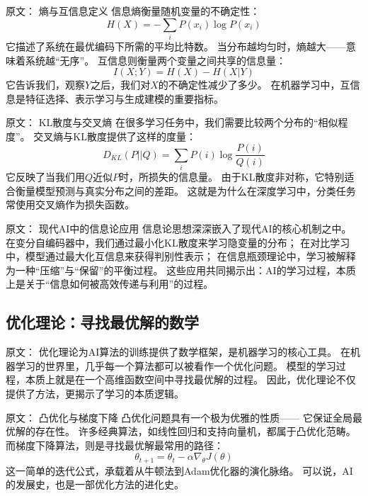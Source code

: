 原文：
熵与互信息定义
信息熵衡量随机变量的不确定性：
$$H(X) = -\sum_{i} P(x_i) \log P(x_i)$$
它描述了系统在最优编码下所需的平均比特数。  
当分布越均匀时，熵越大——意味着系统越“无序”。  
互信息则衡量两个变量之间共享的信息量：
$$I(X;Y) = H(X) - H(X|Y)$$
它告诉我们，观察$Y$之后，我们对$X$的不确定性减少了多少。  
在机器学习中，互信息是特征选择、表示学习与生成建模的重要指标。



原文：
KL散度与交叉熵
在很多学习任务中，我们需要比较两个分布的“相似程度”。  
交叉熵与KL散度提供了这样的度量：
$$D_{KL}(P||Q) = \sum_i P(i)\log\frac{P(i)}{Q(i)}$$
它反映了当我们用$Q$近似$P$时，所损失的信息量。  
由于KL散度非对称，它特别适合衡量模型预测与真实分布之间的差距。  
这就是为什么在深度学习中，分类任务常使用交叉熵作为损失函数。



原文：
现代AI中的信息论应用
信息论思想深深嵌入了现代AI的核心机制之中。  
在变分自编码器中，我们通过最小化KL散度来学习隐变量的分布；  
在对比学习中，模型通过最大化互信息来获得判别性表示；  
在信息瓶颈理论中，学习被解释为一种“压缩”与“保留”的平衡过程。  
这些应用共同揭示出：AI的学习过程，本质上是关于“信息如何被高效传递与利用”的过程。



\subsection{优化理论：寻找最优解的数学}

原文：
优化理论为AI算法的训练提供了数学框架，是机器学习的核心工具。
在机器学习的世界里，几乎每一个算法都可以被看作一个优化问题。  
模型的学习过程，本质上就是在一个高维函数空间中寻找最优解的过程。  
因此，优化理论不仅提供了方法，更揭示了学习的本质逻辑。



原文：
凸优化与梯度下降
凸优化问题具有一个极为优雅的性质——  
它保证全局最优解的存在性。  
许多经典算法，如线性回归和支持向量机，都属于凸优化范畴。  
而梯度下降算法，则是寻找最优解最常用的路径：  
$$\theta_{t+1} = \theta_t - \alpha \nabla_\theta J(\theta)$$  
这一简单的迭代公式，承载着从牛顿法到Adam优化器的演化脉络。  
可以说，AI的发展史，也是一部优化方法的进化史。



